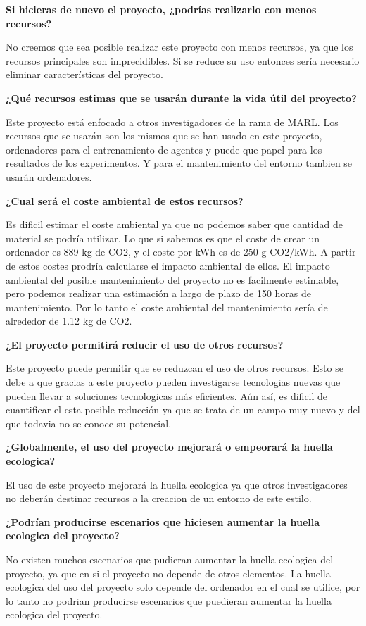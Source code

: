 \textbf{Si hicieras de nuevo el proyecto, ¿podrías realizarlo con menos recursos?}

No creemos que sea posible realizar este proyecto con menos recursos, ya que los recursos principales son imprecidibles. Si se reduce su uso entonces sería necesario eliminar características del proyecto.

\textbf{¿Qué recursos estimas que se usarán durante la vida útil del proyecto?}

Este proyecto está enfocado a otros investigadores de la rama de MARL. Los recursos que se usarán son los mismos que se han usado en este proyecto, ordenadores para el entrenamiento de agentes y puede que papel para los resultados de los experimentos. Y para el mantenimiento del entorno tambien se usarán ordenadores.

\textbf{¿Cual será el coste ambiental de estos recursos?}

Es dificil estimar el coste ambiental ya que no podemos saber que cantidad de material se podría utilizar. Lo que si sabemos es que el coste de crear un ordenador es 889 kg de CO2, y el coste por kWh es de 250 g CO2/kWh. A partir de estos costes prodría calcularse el impacto ambiental de ellos. El impacto ambiental del posible mantenimiento del proyecto no es facilmente estimable, pero podemos realizar una estimación a largo de plazo de 150 horas de mantenimiento. Por lo tanto el coste ambiental del mantenimiento sería de alrededor de 1.12 kg de CO2.

\textbf{¿El proyecto permitirá reducir el uso de otros recursos?}

Este proyecto puede permitir que se reduzcan el uso de otros recursos. Esto se debe a que gracias a este proyecto pueden investigarse tecnologias nuevas que pueden llevar a soluciones tecnologicas más eficientes. Aún así, es dificil de cuantificar el esta posible reducción ya que se trata de un campo muy nuevo y del que todavia no se conoce su potencial.

\textbf{¿Globalmente, el uso del proyecto mejorará o empeorará la huella ecologica?}

El uso de este proyecto mejorará la huella ecologica ya que otros investigadores no deberán destinar recursos a la creacion de un entorno de este estilo.

\textbf{¿Podrían producirse escenarios que hiciesen aumentar la huella ecologica del proyecto?}

No existen muchos escenarios que pudieran aumentar la huella ecologica del proyecto, ya que en si el proyecto no depende de otros elementos. La huella ecologica del uso del proyecto solo depende del ordenador en el cual se utilice, por lo tanto no podrian producirse escenarios que puedieran aumentar la huella ecologica del proyecto.

